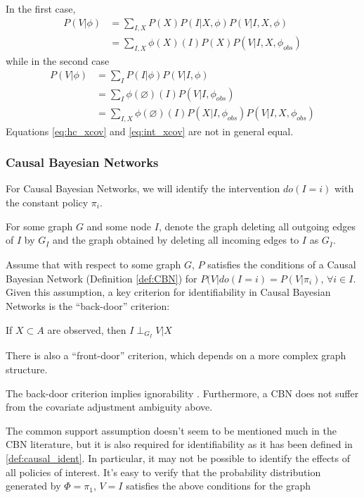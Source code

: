 In the first case,
\begin{align}
    P(V|\phi)&=\sum_{I,X} P(X) P(I|X,\phi) P(V|I,X,\phi)\\
             &=\sum_{I,X} \phi(X)(I) P(X)  P(V|I,X,\phi_{obs}) \label{eq:hc_xcov}
\end{align}
while in the second case
\begin{align}
    P(V|\phi)&=\sum_I P(I|\phi) P(V|I,\phi) \\
             &=\sum_I \phi(\varnothing)(I) P(V|I,\phi_{obs})\\
             &=\sum_{I,X} \phi(\varnothing)(I) P(X|I,\phi_{obs}) P(V|I,X,\phi_{obs}) \label{eq:int_xcov}
\end{align}
Equations \ref{eq:hc_xcov} and \ref{eq:int_xcov} are not in general equal.

\subsubsection{Causal Bayesian Networks}

For Causal Bayesian Networks, we will identify the intervention $do(I=i)$ with the constant policy $\pi_i$.

For some graph $G$ and some node $I$, denote the graph deleting all outgoing edges of $I$ by $G_{\underline{I}}$ and the graph obtained by deleting all incoming edges to $I$ as $G_{\overline{I}}$.

Assume that with respect to some graph $G$, $P$ satisfies the conditions of a Causal Bayesian Network (Definition \ref{def:CBN}) for $P(V|do(I=i)=P(V|\pi_i)$, $\forall i\in I$. Given this assumption, a key criterion for identifiability in Causal Bayesian Networks is the ``back-door'' criterion:

If $X\subset A$ are observed, then $I\perp_{G_{\underline{I}}} V|X$

There is also a ``front-door'' criterion, which depends on a more complex graph structure.

The back-door criterion implies ignorability \cite{pearl_causality:_2009}. Furthermore, a CBN does not suffer from the covariate adjustment ambiguity above.

The common support assumption doesn't seem to be mentioned much in the CBN literature, but it is also required for identifiability as it has been defined in \ref{def:causal_ident}. In particular, it may not be possible to identify the effects of all policies of interest. It's easy to verify that the probability distribution generated by $\Phi=\pi_1$, $V=I$ satisfies the above conditions for the graph

